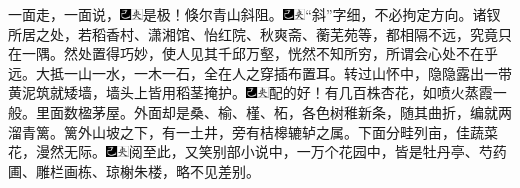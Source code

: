 一面走，一面说，{\includegraphics[width=3mm]{../Images/00003}\includegraphics[width=3mm]{../Images/00012}\footnotesize \kaishu 是极！}倏尔青山斜阻。{\includegraphics[width=3mm]{../Images/00003}\includegraphics[width=3mm]{../Images/00012}\footnotesize \kaishu “斜”字细，不必拘定方向。诸钗所居之处，若稻香村、潇湘馆、怡红院、秋爽斋、蘅芜苑等，都相隔不远，究竟只在一隅。然处置得巧妙，使人见其千邱万壑，恍然不知所穷，所谓会心处不在乎远。大抵一山一水，一木一石，全在人之穿插布置耳。}转过山怀中，隐隐露出一带黄泥筑就矮墙，墙头上皆用稻茎掩护。{\includegraphics[width=3mm]{../Images/00003}\includegraphics[width=3mm]{../Images/00012}\footnotesize \kaishu 配的好！}有几百株杏花，如喷火蒸霞一般。里面数楹茅屋。外面却是桑、榆、槿、柘，各色树稚新条，随其曲折，编就两溜青篱。篱外山坡之下，有一土井，旁有桔槔辘轳之属。下面分畦列亩，佳蔬菜花，漫然无际。{\includegraphics[width=3mm]{../Images/00003}\includegraphics[width=3mm]{../Images/00012}\footnotesize \kaishu 阅至此，又笑别部小说中，一万个花园中，皆是牡丹亭、芍药圃、雕栏画栋、琼榭朱楼，略不见差别。}

